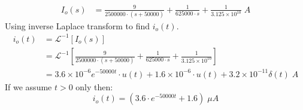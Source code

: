 \begin{enumerate}
{		\begin{align*}
		I_o(s) &= \frac{9}{2500000 \cdot(s+50000)} + \frac{1}{625000 \cdot s} 
		+ \frac{1}{3.125 \times 10^{10}} \; A
		\end{align*}
		Using inverse Laplace transform to find $i_o(t)$.
		\begin{align*}
		i_o(t) &= \mathcal{L}^{-1}\left[ I_o(s) \right]\\
		&= \mathcal{L}^{-1} \left[ \frac{9}{2500000 \cdot(s+50000)} 
		+ \frac{1}{625000 \cdot s} + \frac{1}{3.125 \times 10^{10}} \right]\\
		&= 3.6 \times 10^{-6} e^{-50000t} \cdot u(t) + 1.6 \times 10^{-6} \cdot u(t) + 3.2 \times 10^{-11} \delta(t) \; A
		\end{align*}
		If we assume $t>0$ only then:
		$$ i_o(t) = (3.6 \cdot e^{-50000t} + 1.6) \; \mu A $$
	}
\end{enumerate}
